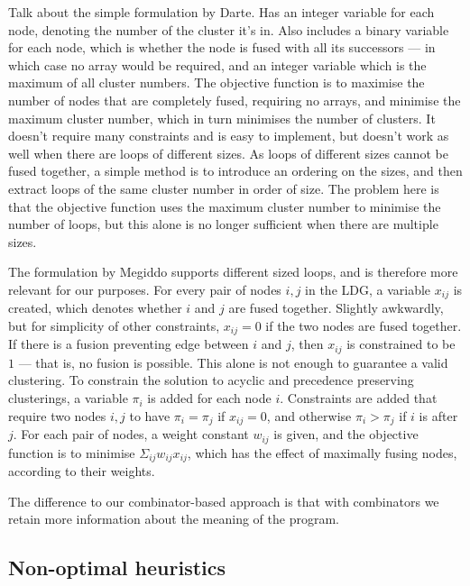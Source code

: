 Talk about the simple formulation by Darte\cite{darte2002contraction}. Has an integer variable for each node, denoting the number of the cluster it's in.
Also includes a binary variable for each node, which is whether the node is fused with all its successors --- in which case no array would be required, and an integer variable which is the maximum of all cluster numbers.
The objective function is to maximise the number of nodes that are completely fused, requiring no arrays, and minimise the maximum cluster number, which in turn minimises the number of clusters.
It doesn't require many constraints and is easy to implement, but doesn't work as well when there are loops of different sizes.
As loops of different sizes cannot be fused together, a simple method is to introduce an ordering on the sizes, and then extract loops of the same cluster number in order of size.
The problem here is that the objective function uses the maximum cluster number to minimise the number of loops, but this alone is no longer sufficient when there are multiple sizes.


The formulation by Megiddo\cite{megiddo1998optimal} supports different sized loops, and is therefore more relevant for our purposes.
For every pair of nodes $i,j$ in the LDG, a variable $x_{ij}$ is created, which denotes whether $i$ and $j$ are fused together.
Slightly awkwardly, but for simplicity of other constraints, $x_{ij} = 0$ if the two nodes are fused together.
If there is a fusion preventing edge between $i$ and $j$, then $x_{ij}$ is constrained to be $1$ --- that is, no fusion is possible.
This alone is not enough to guarantee a valid clustering.
To constrain the solution to acyclic and precedence preserving clusterings, a variable $\pi_i$ is added for each node $i$.
Constraints are added that require two nodes $i,j$ to have $\pi_i = \pi_j$ if $x_{ij} = 0$, and otherwise $\pi_i > \pi_j$ if $i$ is after $j$.
For each pair of nodes, a weight constant $w_{ij}$ is given, and the objective function is to minimise $\Sigma_{ij} w_{ij} x_{ij}$, which has the effect of maximally fusing nodes, according to their weights.

The difference to our combinator-based approach is that with combinators we retain more information about the meaning of the program.


\subsection{Non-optimal heuristics}

